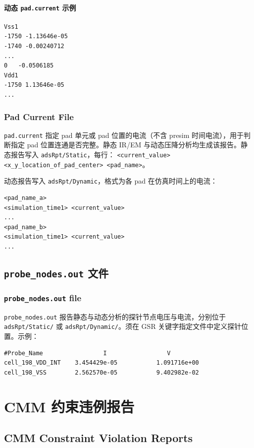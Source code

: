 \paragraph{动态 \texttt{pad.current} 示例}
\begin{lstlisting}
Vss1
-1750 -1.13646e-05
-1740 -0.00240712
...
0   -0.0506185
Vdd1
-1750 1.13646e-05
...
\end{lstlisting}

\subsubsection*{Pad Current File}

\texttt{pad.current} 指定 pad 单元或 pad 位置的电流（不含 presim 时间电流），用于判断指定 pad 位置连通是否完整。静态 IR/EM 与动态压降分析均生成该报告。静态报告写入 \texttt{adsRpt/Static}，每行：
\texttt{<current\_value> <x\_y\_location\_of\_pad\_center> <pad\_name>}。

动态报告写入 \texttt{adsRpt/Dynamic}，格式为各 pad 在仿真时间上的电流：
\begin{lstlisting}
<pad_name_a>
<simulation_time1> <current_value>
...
<pad_name_b>
<simulation_time1> <current_value>
...
\end{lstlisting}

\subsection{\texttt{probe\_nodes.out} 文件}
\subsubsection*{\texttt{probe\_nodes.out} file}

\texttt{probe\_nodes.out} 报告静态与动态分析的探针节点电压与电流，分别位于 \texttt{adsRpt/Static/} 或 \texttt{adsRpt/Dynamic/}。须在  GSR 关键字指定文件中定义探针位置。示例：
\begin{lstlisting}
#Probe_Name                 I                 V
cell_198_VDD_INT    3.454429e-05           1.091716e+00
cell_198_VSS        2.562570e-05           9.402982e-02
\end{lstlisting}

\section{CMM 约束违例报告}
\subsection*{CMM Constraint Violation Reports}

